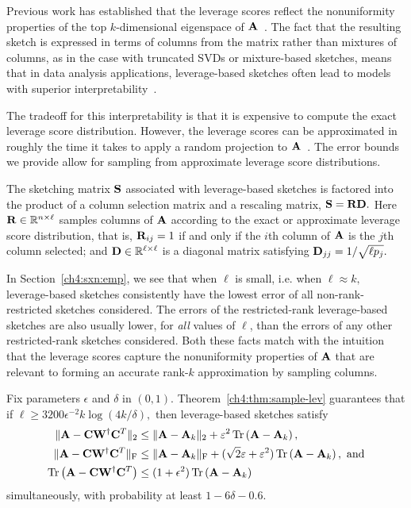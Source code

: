 \begin{description}
 Previous
 work has established that the leverage scores reflect the nonuniformity properties of the
 top $k$-dimensional eigenspace of $\mathbf{A}$~\cite{DM10}. The fact that the resulting sketch
 is expressed in terms of columns from the matrix rather than mixtures of columns, as in the case with 
 truncated SVDs or mixture-based sketches, means that in data analysis applications, 
 leverage-based sketches often lead to models with superior interpretability~\cite{Paschou07b,DM09CUR,MM11,YMSCBWD13}.
 
 The tradeoff for this interpretability is that it is expensive to compute the exact leverage score distribution.
 However, the leverage scores can be approximated in roughly the time it takes to 
 apply a random projection to $\mathbf{A}$~\cite{DMMW12}. The error bounds we provide allow for sampling 
 from approximate leverage score distributions.

 The sketching matrix $\mathbf{S}$ associated with leverage-based sketches is factored into the product
 of a column selection matrix and a rescaling matrix, $\mathbf{S} = \mathbf{R} \mathbf{D}.$ Here $\mathbf{R} \in \mathbb{R}^{n \times \ell}$
 samples columns of $\mathbf{A}$ according to the exact or approximate leverage score distribution, that is,
 $\mathbf{R}_{ij} = 1$ if and only if the $i$th column of $\mathbf{A}$ is the $j$th column selected; and $\mathbf{D} \in \mathbb{R}^{\ell \times \ell}$
 is a diagonal matrix satisfying $\mathbf{D}_{jj} = 1/\sqrt{\ell p_j}.$ 
 
 In Section~\ref{ch4:sxn:emp}, we see that when $\ell$ is small, i.e. when $\ell \approx k,$ leverage-based sketches consistently
 have the lowest error of all non-rank-restricted sketches considered. The errors of the restricted-rank leverage-based sketches
 are also usually lower, for \emph{all} values of $\ell$, than the errors of any other restricted-rank sketches
 considered. Both these facts match with the intuition that the leverage scores capture the nonuniformity
 properties of $\mathbf{A}$ that are relevant to forming an accurate rank-$k$ approximation by
 sampling columns. 
 
  Fix parameters $\epsilon$ and $\delta$ in $(0,1).$ Theorem~\ref{ch4:thm:sample-lev} guarantees that if
  $\ell \geq 3200 \epsilon^{-2} k\log(4k/\delta),$ then leverage-based sketches satisfy
 \begin{align*}
  \|\mathbf{A} - \mathbf{C}\mathbf{W}^\dagger \mathbf{C}^T\|_2 & \leq \|\mathbf{A} - \mathbf{A}_k\|_2 
       + \varepsilon^2 \operatorname{Tr}\left(\mathbf{A} - \mathbf{A}_k\right), \\
  \|\mathbf{A} - \mathbf{C}\mathbf{W}^\dagger \mathbf{C}^T\|_{\mathrm{F}} & \leq \|\mathbf{A} - \mathbf{A}_k\|_{\mathrm{F}} + 
     (\sqrt{2}\varepsilon + \varepsilon^2) \operatorname{Tr}\left(\mathbf{A} - \mathbf{A}_k\right) , \text{ and} \\
  \operatorname{Tr}\left(\mathbf{A} - \mathbf{C}\mathbf{W}^\dagger \mathbf{C}^T\right) & \leq 
    (1 + \epsilon^2)\operatorname{Tr}\left(\mathbf{A} - \mathbf{A}_k\right) 
 \end{align*}
 simultaneously, with probability at least $1-6\delta - 0.6.$
 

\end{description}
